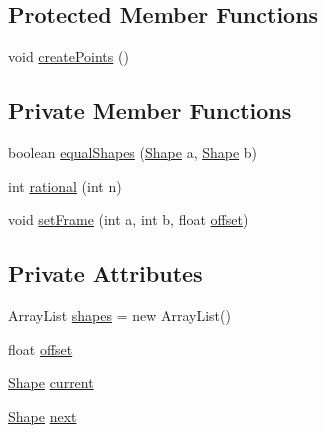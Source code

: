 \subsection*{Protected Member Functions}
\begin{DoxyCompactItemize}
\item 
void \mbox{\hyperlink{classorg_1_1newdawn_1_1slick_1_1geom_1_1_morph_shape_a7c393dbb6244ecd3c7e6165ce135e1e8}{create\+Points}} ()
\end{DoxyCompactItemize}
\subsection*{Private Member Functions}
\begin{DoxyCompactItemize}
\item 
boolean \mbox{\hyperlink{classorg_1_1newdawn_1_1slick_1_1geom_1_1_morph_shape_a46b64dc33a72347eb5d6085bc48a3557}{equal\+Shapes}} (\mbox{\hyperlink{classorg_1_1newdawn_1_1slick_1_1geom_1_1_shape}{Shape}} a, \mbox{\hyperlink{classorg_1_1newdawn_1_1slick_1_1geom_1_1_shape}{Shape}} b)
\item 
int \mbox{\hyperlink{classorg_1_1newdawn_1_1slick_1_1geom_1_1_morph_shape_ad93f28ac5dd367627bfadbd8fec48213}{rational}} (int n)
\item 
void \mbox{\hyperlink{classorg_1_1newdawn_1_1slick_1_1geom_1_1_morph_shape_acc6cd1ff5332979f86cc03d8bb520846}{set\+Frame}} (int a, int b, float \mbox{\hyperlink{classorg_1_1newdawn_1_1slick_1_1geom_1_1_morph_shape_a006e01581d798601f1aaf5bea5dc1583}{offset}})
\end{DoxyCompactItemize}
\subsection*{Private Attributes}
\begin{DoxyCompactItemize}
\item 
Array\+List \mbox{\hyperlink{classorg_1_1newdawn_1_1slick_1_1geom_1_1_morph_shape_a24eb760097e650b268700165c0cd66f2}{shapes}} = new Array\+List()
\item 
float \mbox{\hyperlink{classorg_1_1newdawn_1_1slick_1_1geom_1_1_morph_shape_a006e01581d798601f1aaf5bea5dc1583}{offset}}
\item 
\mbox{\hyperlink{classorg_1_1newdawn_1_1slick_1_1geom_1_1_shape}{Shape}} \mbox{\hyperlink{classorg_1_1newdawn_1_1slick_1_1geom_1_1_morph_shape_adc35bd32e88974946c096e273b648575}{current}}
\item 
\mbox{\hyperlink{classorg_1_1newdawn_1_1slick_1_1geom_1_1_shape}{Shape}} \mbox{\hyperlink{classorg_1_1newdawn_1_1slick_1_1geom_1_1_morph_shape_a5ce48bb978769ccae833b7c9f2a7df27}{next}}
\end{DoxyCompactItemize}
